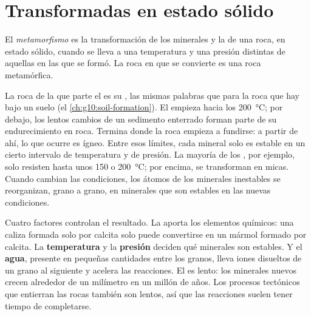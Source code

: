 \section{Transformadas en estado sólido}

\begin{definition}[Metamorfismo]\label{def:g12:metamorphic-rocks:metamorphism}
El \emph{metamorfismo} es la transformación de los
minerales y la  de una roca, en estado sólido, cuando se lleva a una
temperatura y una presión distintas de aquellas en las que se formó. La roca
en que se convierte es una roca metamórfica.
\end{definition}

La roca de la que parte el  es su , las mismas palabras
que para la roca que hay bajo un suelo (el \cref{ch:g10:soil-formation}). El
 empieza hacia los \qty{200}{\celsius}; por debajo, los lentos
cambios de un sedimento enterrado forman parte de su endurecimiento en roca.
Termina donde la roca empieza a fundirse: a partir de ahí, lo que ocurre es
ígneo. Entre esos límites, cada mineral solo es estable en un cierto
intervalo de temperatura y de presión. La mayoría de los , por ejemplo, solo resisten hasta unos 150 o \qty{200}{\celsius}; por
encima, se transforman en micas. Cuando cambian las condiciones, los átomos de
los minerales inestables se reorganizan, grano a grano, en minerales que son
estables en las nuevas condiciones.

Cuatro factores controlan el resultado. La \textbf{} aporta los
elementos químicos: una caliza formada solo por calcita solo puede convertirse
en un mármol formado por calcita. La \textbf{temperatura} y la \textbf{presión} deciden qué
minerales son estables. Y el \textbf{agua}, presente en pequeñas cantidades
entre los granos, lleva iones disueltos de un grano al siguiente y acelera
las reacciones. El  es lento: los minerales nuevos crecen alrededor
de un milímetro en un millón de años. Los procesos tectónicos que entierran
las rocas también son lentos, así que las reacciones suelen tener tiempo de
completarse.

